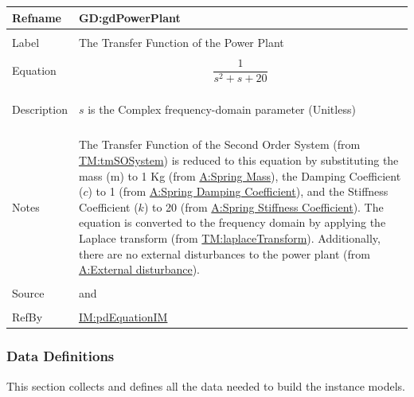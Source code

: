 \documentclass[12pt]{article}
\begin{document}
\vspace{\baselineskip}
\noindent
\begin{minipage}{\textwidth}
\begin{tabular}{>{\raggedright}p{}>{\raggedright\arraybackslash}p{}}
\toprule \textbf{Refname} & \textbf{GD:gdPowerPlant}
\label{GD:gdPowerPlant}
\\ \midrule \\
Label & The Transfer Function of the Power Plant
        
\\ \midrule \\
Equation & \begin{displaymath}
           \frac{1}{s^{2}+s+20}
           \end{displaymath}
\\ \midrule \\
Description & \begin{symbDescription}
              \item{$s$ is the Complex frequency-domain parameter (Unitless)}
              \end{symbDescription}
\\ \midrule \\
Notes & The Transfer Function of the Second Order System (from \hyperref[TM:tmSOSystem]{TM:tmSOSystem}) is reduced to this equation by substituting the mass (m) to 1 Kg (from \hyperref[massSpring]{A:Spring Mass}), the Damping Coefficient ($c$) to 1 (from \hyperref[dampingCoeffSpring]{A:Spring Damping Coefficient}), and the Stiffness Coefficient ($k$) to 20 (from \hyperref[stiffnessCoeffSpring]{A:Spring Stiffness Coefficient}). The equation is converted to the frequency domain by applying the Laplace transform (from \hyperref[TM:laplaceTransform]{TM:laplaceTransform}). Additionally, there are no external disturbances to the power plant (from \hyperref[externalDisturb]{A:External disturbance}).
        
\\ \midrule \\
Source & \cite{pidWiki} and \cite{abbasi2015}
         
\\ \midrule \\
RefBy & \hyperref[IM:pdEquationIM]{IM:pdEquationIM}
        
\\ \bottomrule
\end{tabular}
\end{minipage}
\subsubsection{Data Definitions}
\label{Sec:DDs}
This section collects and defines all the data needed to build the instance models.
\end{document}
